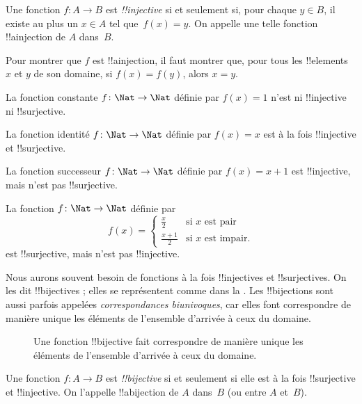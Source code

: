 \documentclass[../../../include/open-logic-section]{subfiles}
\begin{document}
\begin{defn}
Une fonction $f \colon A \rightarrow B$ est \emph{!!{injective}} si et
seulement si, pour chaque $y \in B$, il existe au plus un $x \in A$
tel que~$f(x) = y$. On appelle une telle fonction !!a{injection}
de $A$ dans~$B$.
\end{defn}

\begin{explain}
Pour montrer que $f$ est !!a{injection}, il faut montrer que,
pour tous les !!{element}s $x$ et $y$ de son domaine,
si $f(x)=f(y)$, alors $x=y$.
\end{explain}

\begin{ex}
La fonction constante $f\colon \Nat \to \Nat$ définie par $f(x) = 1$
n’est ni !!{injective} ni !!{surjective}.

La fonction identité $f\colon \Nat \to \Nat$ définie par $f(x) = x$
est à la fois !!{injective} et !!{surjective}.

La fonction successeur $f \colon \Nat \to \Nat$ définie par $f(x) = x+1$
est !!{injective}, mais n’est pas !!{surjective}.

La fonction $f \colon \Nat \to \Nat$ définie par
\[
  f(x) =
  \begin{cases}
    \frac{x}{2} & \text{si $x$ est pair} \\
    \frac{x+1}{2} & \text{si $x$ est impair.}
  \end{cases}
\]
est !!{surjective}, mais n’est pas !!{injective}.
\end{ex}

\begin{explain}
Nous aurons souvent besoin de fonctions à la fois !!{injective}s et
!!{surjective}s. On les dit !!{bijective}s ; elles se représentent
comme dans la . Les !!{bijection}s sont aussi
parfois appelées \emph{correspondances biunivoques}, car elles font
correspondre de manière unique les éléments de l’ensemble d’arrivée
à ceux du domaine.
\begin{figure}
  \caption{Une fonction !!{bijective} fait correspondre de manière unique
    les éléments de l’ensemble d’arrivée à ceux du domaine.}
\end{figure}
\end{explain}

\begin{defn}[!!^{bijection}]
Une fonction $f \colon A \to B$ est \emph{!!{bijective}} si et seulement
si elle est à la fois !!{surjective} et !!{injective}.
On l’appelle !!a{bijection} de $A$ dans~$B$ (ou entre $A$ et~$B$).
\end{defn}
\end{document}
